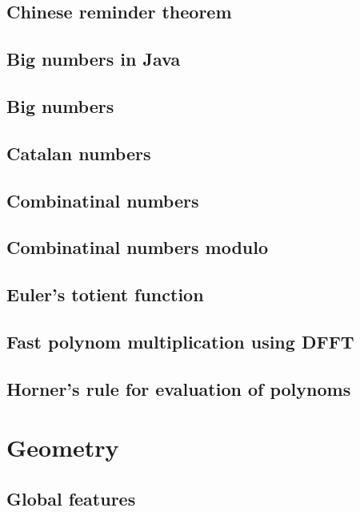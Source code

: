 \documentclass[a4paper]{article}
\begin{document}
\begin{multicols*}{3}
    \subsection{Chinese reminder theorem}
        
    \subsection{Big numbers in Java}
        
    \subsection{Big numbers}
        
    \subsection{Catalan numbers}
        
    \subsection{Combinatinal numbers}
        
    \subsection{Combinatinal numbers modulo}
        
    \subsection{Euler's totient function}
        
    \subsection{Fast polynom multiplication using DFFT}
        
    \subsection{Horner's rule for evaluation of polynoms}
        
\section{Geometry}
    \subsection{Global features}
        

\end{multicols*}
\end{document}
